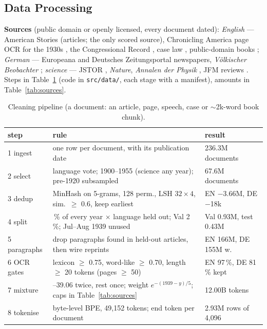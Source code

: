 \documentclass[final]{article}
\let\oldsubsection\subsection
\renewcommand{\subsection}{\vspace{-0.4em}\oldsubsection}
\begin{document}
\subsection*{Data Processing}
\textbf{Sources} (public domain or openly licensed, every document dated): \emph{English} --- American Stories
\citep{dell2023} (articles; the only scored source), Chronicling America
page OCR for the 1930s \citep{chronam2026}, the Congressional Record \citep{gentzkow2018}, case law
\citep{cap2024}, public-domain books \citep{locpdbooks}; \emph{German} --- Europeana \citep{europeana2015} and
Deutsches Zeitungsportal \citep{ddb2024} newspapers, \emph{V\"olkischer Beobachter} \citep{vb1925}; \emph{science}
--- JSTOR \citep{jstorejc}, \emph{Nature}, \emph{Annalen der Physik} \citep{iascience}, JFM reviews \citep{jfm}.
Steps in Table~\ref{tab:pipeline} (code in \texttt{src/data/}, each stage with a manifest), amounts in
Table~\ref{tab:sources}.

\begin{table}[!h]
\centering\footnotesize\setlength{\tabcolsep}{3pt}
\caption{Cleaning pipeline (a document: an article, page, speech, case or $\sim$2k-word book chunk).}
\label{tab:pipeline}
\begin{tabular}{@{}l>{\raggedright\arraybackslash}p{8.85cm}l@{}}
\toprule
step & rule & result \\
\midrule
1 ingest & one row per document, with its publication date & 236.3M documents \\
2 select & language vote; 1900--1955 (science any year); pre-1920 subsampled & 67.6M documents \\
3 dedup & MinHash on 5-grams, 128 perm., LSH $32\times4$, sim.\ $\ge$ 0.6, keep earliest & EN $-$3.66M,
DE $-$18k \\
4 split & 2\,\% of every year $\times$ language held out; Val 2\,\%; Jul--Aug 1939 unused & Val 0.93M, test
0.43M \\
5 paragraphs & drop paragraphs found in held-out articles, then wire reprints & EN 166M, DE 155M w. \\
6 OCR gates & lexicon $\ge$ 0.75, word-like $\ge$ 0.70, length $\ge$ 20 tokens (pages $\ge$ 50) & EN 97\,\%, DE 81\,\%
kept \\
7 mixture & 1934--39.06 twice, rest once; weight $e^{-(1939-y)/5}$; caps in Table~\ref{tab:sources} &
12.00B tokens \\
8 tokenise & byte-level BPE, 49,152 tokens; end token per document & 2.93M rows of 4,096 \\
\bottomrule
\end{tabular}
\end{table}
\end{document}

